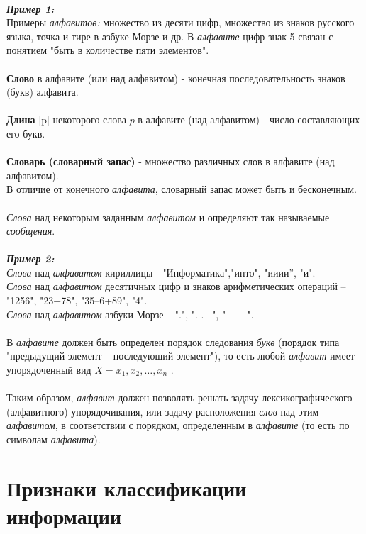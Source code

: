 \\\emph{\textbf{Пример 1:}}
\\Примеры \emph{алфавитов:} множество из десяти цифр, множество из знаков русского языка, точка и тире в азбуке Морзе и др. В \emph{алфавите} цифр знак 5 связан с понятием "быть в количестве пяти элементов".\\
\\\textbf{Слово} в алфавите (или над алфавитом) - конечная последовательность знаков (букв) алфавита.
\\
\\\textbf{Длина} |p| некоторого слова $p$ в алфавите (над алфавитом) - число составляющих его букв.
\\
\\\textbf{Словарь (словарный запас)} - множество различных слов в алфавите (над алфавитом).
\\В отличие от конечного \emph{алфавита}, словарный запас может быть и бесконечным.\\
\\\emph{Слова} над некоторым заданным \emph{алфавитом} и определяют так называемые \emph{сообщения}.\\
\\\emph{\textbf{Пример 2:}}
\\\emph{Слова} над \emph{алфавитом} кириллицы - "Информатика","инто", "ииии'', "и". 
\\\emph{Слова} над \emph{алфавитом} десятичных цифр и знаков арифметических операций – "1256", "23+78", "35–6+89", "4". 
\\\emph{Слова} над \emph{алфавитом} азбуки Морзе – ".", ". . –", "– – –".\\
\\В  \emph{алфавите} должен быть определен порядок следования \emph{букв} (порядок типа "предыдущий элемент – последующий элемент"), то есть любой \emph{алфавит} имеет упорядоченный вид $X = {x_1, x_2, …, x_n}$ .\\
\\Таким образом, \emph{алфавит} должен позволять решать задачу лексикографического (алфавитного) упорядочивания, или задачу расположения \emph{слов} над этим \emph{алфавитом}, в соответствии с порядком, определенным в \emph{алфавите} (то есть по символам \emph{алфавита}).

\section{Признаки классификации информации}

